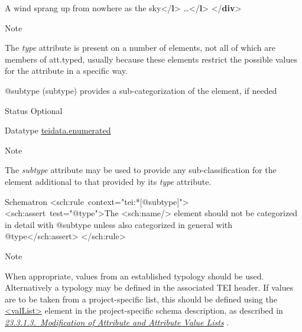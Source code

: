 \begin{reflist}
\begin{sansreflist}
\begin{reflist}
\mbox{}\newline 
\hspace*{1em}A wind sprang up from nowhere as the sky{</\textbf{l}>}\mbox{}\newline 
\hspace*{1em}…{</\textbf{l}>}\mbox{}\newline 
{}\mbox{}\newline 
{</\textbf{div}>}
    \item[{Note}]
  \par
The {\itshape type} attribute is present on a number of elements, not all of which are members of \textsf{att.typed}, usually because these elements restrict the possible values for the attribute in a specific way.
\end{reflist}  
    \item[@subtype]
  (subtype) provides a sub-categorization of the element, if needed
\begin{reflist}
    \item[{Status}]
  Optional
    \item[{Datatype}]
  \hyperref[TEI.teidata.enumerated]{teidata.enumerated}
    \item[{Note}]
  \par
The {\itshape subtype} attribute may be used to provide any sub-classification for the element additional to that provided by its {\itshape type} attribute.
\end{reflist}  
\end{sansreflist}  
    \item[{Schematron}]
   <sch:rule context="tei:*[@subtype]"> <sch:assert test="@type">The <sch:name/> element should not be categorized in detail with @subtype unless also categorized in general with @type</sch:assert> </sch:rule>
    \item[{Note}]
  \par
When appropriate, values from an established typology should be used. Alternatively a typology may be defined in the associated TEI header. If values are to be taken from a project-specific list, this should be defined using the \hyperref[TEI.valList]{<valList>} element in the project-specific schema description, as described in \textit{\hyperref[MDMDAL]{23.3.1.3.\ Modification of Attribute and Attribute Value Lists}} .
\end{reflist}  

